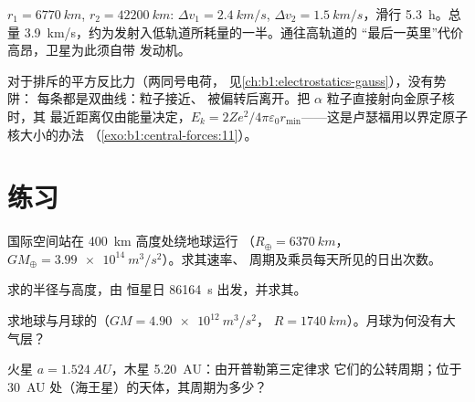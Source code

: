 \begin{example}[从低轨道到地球静止轨道]\label{ex:b1:central-forces:leogeo}
$r_1 = \qty{6770}{km}$, $r_2 = \qty{42200}{km}$: $\Delta v_1 = \qty{2.4}{km/s}$,
$\Delta v_2 = \qty{1.5}{km/s}$，滑行 \qty{5.3}{h}。总量
\qty{3.9}{km/s}，约为发射入低轨道所耗量的一半。通往高轨道的
“最后一英里”代价高昂，卫星为此须自带
发动机。
\end{example}

\begin{remark}[排斥中心]\label{rem:b1:central-forces:rutherford}
对于排斥的平方反比力（两同号电荷，
见\cref{ch:b1:electrostatics-gauss}），没有势阱：
每条都是双曲线：粒子接近、
被偏转后离开。把 $\alpha$ 粒子直接射向金原子核时，其
最近距离仅由能量决定，$E_k =
2Ze^2/4\pi\varepsilon_0 r_{\min}$——这是卢瑟福用以界定原子核大小的办法
（\cref{exo:b1:central-forces:11}）。
\end{remark}

\section{练习}

\begin{exercise}[$\star$]\label{exo:b1:central-forces:1}
国际空间站在 \qty{400}{km} 高度处绕地球运行
（$R_\oplus = \qty{6370}{km}$，$GM_\oplus = \qty{3.99e14}{m^3/s^2}$）。求其速率、
周期及乘员每天所见的日出次数。
\end{exercise}

\begin{exercise}[$\star$]\label{exo:b1:central-forces:2}
求的半径与高度，由
恒星日 \qty{86164}{s} 出发，并求其。
\end{exercise}

\begin{exercise}[$\star$]\label{exo:b1:central-forces:3}
求地球与月球的（$GM = \qty{4.90e12}{m^3/s^2}$，
$R = \qty{1740}{km}$）。月球为何没有大气层？
\end{exercise}

\begin{exercise}[$\star$]\label{exo:b1:central-forces:4}
火星 $a = \qty{1.524}{AU}$，木星 \qty{5.20}{AU}：由开普勒第三定律求
它们的公转周期；位于 \qty{30}{AU} 处（海王星）的天体，其周期为多少？
\end{exercise}

